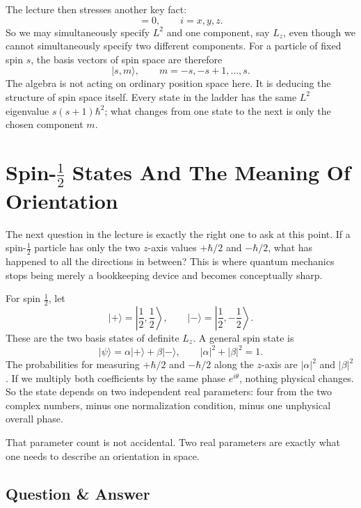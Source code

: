 The lecture then stresses another key fact:
\begin{equation}
[L^2,L_i]=0,\qquad i=x,y,z.
\end{equation}
So we may simultaneously specify \(L^2\) and one component, say \(L_z\), even though we cannot simultaneously specify two different components. For a particle of fixed spin \(s\), the basis vectors of spin space are therefore
\[
\lvert s,m\rangle,\qquad m=-s,-s+1,\dots,s.
\]
The algebra is not acting on ordinary position space here. It is deducing the structure of spin space itself. Every state in the ladder has the same \(L^2\) eigenvalue \(s(s+1)\hbar^2\); what changes from one state to the next is only the chosen component \(m\).

\section{Spin-\(\tfrac12\) States And The Meaning Of Orientation}

The next question in the lecture is exactly the right one to ask at this point. If a spin-\(\tfrac12\) particle has only the two \(z\)-axis values \(+\hbar/2\) and \(-\hbar/2\), what has happened to all the directions in between? This is where quantum mechanics stops being merely a bookkeeping device and becomes conceptually sharp.

For spin \(\tfrac12\), let
\[
\lvert+\rangle=\left\lvert \frac12,\frac12\right\rangle,\qquad
\lvert-\rangle=\left\lvert \frac12,-\frac12\right\rangle.
\]
These are the two basis states of definite \(L_z\). A general spin state is
\begin{equation}
\lvert\psi\rangle=\alpha\lvert+\rangle+\beta\lvert-\rangle,
\qquad
|\alpha|^2+|\beta|^2=1.
\end{equation}
The probabilities for measuring \(+\hbar/2\) and \(-\hbar/2\) along the \(z\)-axis are \(|\alpha|^2\) and \(|\beta|^2\). If we multiply both coefficients by the same phase \(e^{i\theta}\), nothing physical changes. So the state depends on two independent real parameters: four from the two complex numbers, minus one normalization condition, minus one unphysical overall phase.

That parameter count is not accidental. Two real parameters are exactly what one needs to describe an orientation in space.

\subsection{Question \& Answer}

